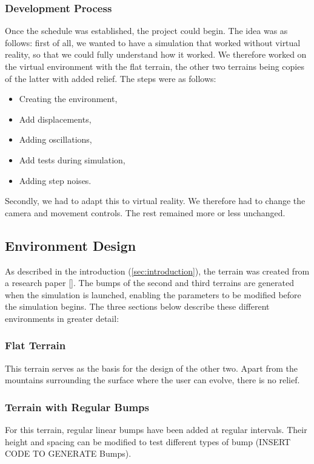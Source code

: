 \documentclass[american]{acmtog} %
\begin{document}
\subsubsection{Development Process}
Once the schedule was established, the project could begin. The idea was as follows: first of all, we wanted to have a simulation that worked without virtual reality, so that we could fully understand how it worked. We therefore worked on the virtual environment with the flat terrain, the other two terrains being copies of the latter with added relief. The steps were as follows:
\begin{itemize}[label=\textbullet]
    \item Creating the environment,
    \item Add displacements,
    \item Adding oscillations,
    \item Add tests during simulation,
    \item Adding step noises.
\end{itemize}
Secondly, we had to adapt this to virtual reality. We therefore had to change the camera and movement controls. The rest remained more or less unchanged.

\subsection{Environment Design}
As described in the introduction (\ref{sec:introduction}), the terrain was created from a research paper [\cite{bumpy_ride}]. The bumps of the second and third terrains are generated when the simulation is launched, enabling the parameters to be modified before the simulation begins. The three sections below describe these different environments in greater detail:

\subsubsection{Flat Terrain}
This terrain serves as the basis for the design of the other two. Apart from the mountains surrounding the surface where the user can evolve, there is no relief.

\subsubsection{Terrain with Regular Bumps}
For this terrain, regular linear bumps have been added at regular intervals. Their height and spacing can be modified to test different types of bump (INSERT CODE TO GENERATE Bumps).
\end{document}

